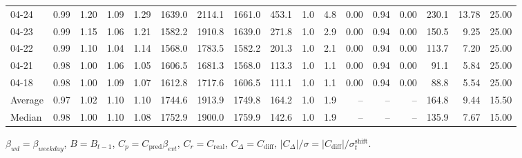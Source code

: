 \begin{threeparttable}
{\begin{tabular}{lrrrrrrrrrrrrrrrr}
  04-24 &         0.99 &           1.20 &          1.09 &          1.29 & 1639.0 & 2114.1 & 1661.0 &      453.1 &                      1.0 &                 4.8 &       0.00 &      0.94 &           0.00 &            230.1 &           13.78 &                  25.00 \\
  04-23 &         0.99 &           1.15 &          1.06 &          1.21 & 1582.2 & 1910.8 & 1639.0 &      271.8 &                      1.0 &                 2.9 &       0.00 &      0.94 &           0.00 &            150.5 &            9.25 &                  25.00 \\
  04-22 &         0.99 &           1.10 &          1.04 &          1.14 & 1568.0 & 1783.5 & 1582.2 &      201.3 &                      1.0 &                 2.1 &       0.00 &      0.94 &           0.00 &            113.7 &            7.20 &                  25.00 \\
  04-21 &         0.98 &           1.00 &          1.06 &          1.05 & 1606.5 & 1681.3 & 1568.0 &      113.3 &                      1.0 &                 1.1 &       0.00 &      0.94 &           0.00 &             91.1 &            5.84 &                  25.00 \\
  04-18 &         0.98 &           1.00 &          1.09 &          1.07 & 1612.8 & 1717.6 & 1606.5 &      111.1 &                      1.0 &                 1.1 &       0.00 &      0.94 &           0.00 &             88.8 &            5.54 &                  25.00 \\
Average &         0.97 &           1.02 &          1.10 &          1.10 & 1744.6 & 1913.9 & 1749.8 &      164.2 &                      1.0 &                 1.9 &         -- &        -- &             -- &            164.8 &            9.44 &                  15.50 \\
 Median &         0.98 &           1.00 &          1.10 &          1.08 & 1752.9 & 1900.0 & 1759.9 &      142.6 &                      1.0 &                 1.9 &         -- &        -- &             -- &            135.9 &            7.67 &                  15.00 \\
\bottomrule
\end{tabular}
}
\begin{tablenotes}\footnotesize
\item $\beta_{wd}=\beta_{weekday}$, $B=B_{t-1}$,
$C_p=C_{\text{pred}}\beta_{evt}$, $C_r=C_{\text{real}}$,
$C_\Delta=C_{\text{diff}}$, $|C_\Delta|/\sigma=|C_{\text{diff}}|/\sigma_t^{\text{shift}}$.
\end{tablenotes}
\end{threeparttable}
\endgroup

